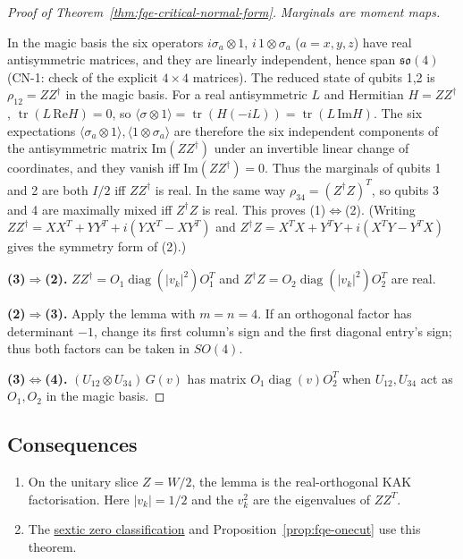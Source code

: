 \begin{proof}[Proof of Theorem~\ref{thm:fqe-critical-normal-form}]
\textit{Marginals are moment maps.}\label{lem:fqe-moment-map}

In the magic basis the six operators \(i\sigma_a\otimes1\), \(i\,1\otimes\sigma_a\) (\(a=x,y,z\))
have real antisymmetric matrices, and they are linearly independent, hence span \(\mathfrak{so}(4)\)
(CN-1: check of the explicit \(4\times4\) matrices). The reduced state of qubits 1,2 is
\(\rho_{12}=ZZ^\dagger\) in the magic basis. For a real antisymmetric \(L\) and Hermitian
\(H=ZZ^\dagger\), \(\operatorname{tr}(L\,\mathrm{Re}H)=0\), so
\(\langle\sigma\otimes1\rangle=\operatorname{tr}(H(-iL))=\operatorname{tr}(L\,\mathrm{Im}H)\). The
six expectations \(\langle\sigma_a\otimes1\rangle,\langle1\otimes\sigma_a\rangle\) are therefore the
six independent components of the antisymmetric matrix \(\mathrm{Im}(ZZ^\dagger)\) under an invertible
linear change of coordinates, and they vanish iff \(\mathrm{Im}(ZZ^\dagger)=0\). Thus the marginals of qubits 1 and 2
are both \(I/2\) iff \(ZZ^\dagger\) is real. In the same way \(\rho_{34}=(Z^\dagger Z)^T\), so
qubits 3 and 4 are maximally mixed iff \(Z^\dagger Z\) is real. This proves
(1)\(\Leftrightarrow\)(2). (Writing \(ZZ^\dagger=XX^T+YY^T+i(YX^T-XY^T)\) and \(Z^\dagger
Z=X^TX+Y^TY+i(X^TY-Y^TX)\) gives the symmetry form of (2).)

\textbf{(3)\(\Rightarrow\)(2).} \(ZZ^\dagger=O_1\operatorname{diag}(|v_k|^2)O_1^T\) and \(Z^\dagger
Z=O_2\operatorname{diag}(|v_k|^2)O_2^T\) are real.

\textbf{(2)\(\Rightarrow\)(3).} Apply the lemma with \(m=n=4\). If an orthogonal factor has
determinant \(-1\), change its first column's sign and the first diagonal entry's sign; thus both
factors can be taken in \(SO(4)\).

\textbf{(3)\(\Leftrightarrow\)(4).} \((U_{12}\otimes U_{34})\,G(v)\) has matrix
\(O_1\operatorname{diag}(v)O_2^T\) when \(U_{12},U_{34}\) act as \(O_1,O_2\) in the magic basis.
\end{proof}

\subsection{Consequences}\label{sec:fqe-critical_four_qubit_normal_form-consequences}

\begin{enumerate}
\def\labelenumi{\arabic{enumi}.}
\item
  On the unitary slice \(Z=W/2\), the lemma is the real-orthogonal KAK factorisation. Here
\(|v_k|=1/2\) and the \(v_k^2\) are the eigenvalues of \(ZZ^T\).
\item
  The \hyperref[sec:fqe-sextic]{sextic zero classification} and
Proposition~\ref{prop:fqe-onecut} use this theorem.
\end{enumerate}

